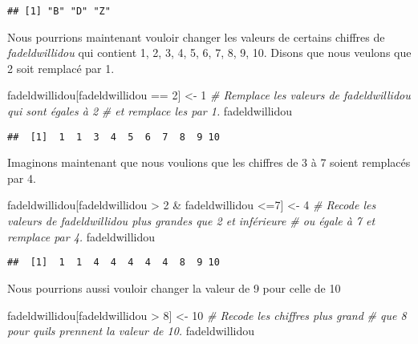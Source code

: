 \documentclass[
]{book}
\newenvironment{Shaded}{\begin{snugshade}}{\end{snugshade}}
\newcommand{\CommentTok}[1]{\textcolor[rgb]{0.56,0.35,0.01}{\textit{#1}}}
\newcommand{\DecValTok}[1]{\textcolor[rgb]{0.00,0.00,0.81}{#1}}
\newcommand{\NormalTok}[1]{#1}
\newcommand{\OtherTok}[1]{\textcolor[rgb]{0.56,0.35,0.01}{#1}}
\newcommand{\SpecialCharTok}[1]{\textcolor[rgb]{0.00,0.00,0.00}{#1}}
\begin{document}
\begin{verbatim}
## [1] "B" "D" "Z"
\end{verbatim}

Nous pourrions maintenant vouloir changer les valeurs de certains chiffres de \emph{fadeldwillidou} qui contient 1, 2, 3, 4, 5, 6, 7, 8, 9, 10. Disons que nous veulons que 2 soit remplacé par 1.

\begin{Shaded}
\begin{Highlighting}[]
\NormalTok{fadeldwillidou[fadeldwillidou }\SpecialCharTok{==} \DecValTok{2}\NormalTok{] }\OtherTok{\textless{}{-}} \DecValTok{1}
\CommentTok{\# Remplace les valeurs de fadeldwillidou qui sont égales à 2 }
\CommentTok{\# et remplace les par 1.}
\NormalTok{fadeldwillidou}
\end{Highlighting}
\end{Shaded}

\begin{verbatim}
##  [1]  1  1  3  4  5  6  7  8  9 10
\end{verbatim}

Imaginons maintenant que nous voulions que les chiffres de 3 à 7 soient remplacés par 4.

\begin{Shaded}
\begin{Highlighting}[]
\NormalTok{fadeldwillidou[fadeldwillidou }\SpecialCharTok{\textgreater{}} \DecValTok{2} \SpecialCharTok{\&}\NormalTok{ fadeldwillidou }\SpecialCharTok{\textless{}=}\DecValTok{7}\NormalTok{] }\OtherTok{\textless{}{-}} \DecValTok{4}
\CommentTok{\# Recode les valeurs de fadeldwillidou plus grandes que 2 et inférieure}
\CommentTok{\# ou égale à 7 et remplace par 4.}
\NormalTok{fadeldwillidou}
\end{Highlighting}
\end{Shaded}

\begin{verbatim}
##  [1]  1  1  4  4  4  4  4  8  9 10
\end{verbatim}

Nous pourrions aussi vouloir changer la valeur de 9 pour celle de 10

\begin{Shaded}
\begin{Highlighting}[]
\NormalTok{fadeldwillidou[fadeldwillidou }\SpecialCharTok{\textgreater{}} \DecValTok{8}\NormalTok{] }\OtherTok{\textless{}{-}} \DecValTok{10} \CommentTok{\# Recode les chiffres plus grand }
\CommentTok{\# que 8 pour qu\textquotesingle{}ils prennent la valeur de 10. }
\NormalTok{fadeldwillidou}
\end{Highlighting}
\end{Shaded}
\end{document}
